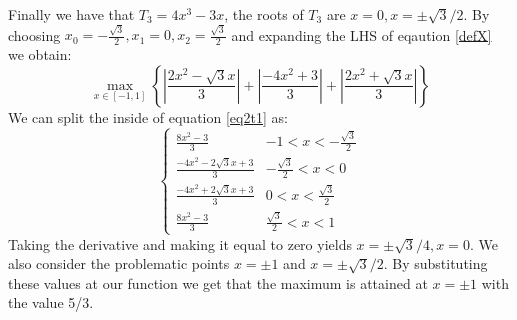 \begin{solution}
Finally we have that $T_3 = 4x^3-3x$, the roots of $T_3$ are $x=0, x=\pm \sqrt{3}/2$. By choosing $x_0 = -\frac{\sqrt{3}}{2}, x_1 = 0, x_2 = \frac{\sqrt{3}}{2}$ and expanding the LHS of eqaution \ref{defX} we obtain:
\begin{equation}
\max_{x \in [-1,1]} \left \{ \left | \frac{2x^2-\sqrt{3}x}{3} \right | + \left | \frac{-4x^2+3}{3} \right | + \left | \frac{2x^2+\sqrt{3}x}{3} \right | \right \}
\label{eq2t1}
\end{equation}
We can split the inside of equation \ref{eq2t1} as:
\[ \begin{cases} 
      \frac{8x^2-3}{3}  &-1< x< -\frac{\sqrt{3}}{2} \\
      \frac{-4x^2-2\sqrt{3}x+3}{3}  &-\frac{\sqrt{3}}{2}< x< 0 \\
      \frac{-4x^2+2\sqrt{3}x+3}{3} & 0 < x < \frac{\sqrt{3}}{2} \\
      \frac{8x^2-3}{3} & \frac{\sqrt{3}}{2}<x<1 
   \end{cases}
\]
Taking the derivative and making it equal to zero yields $x = \pm \sqrt{3}/4, x = 0$. We also consider the problematic points $x = \pm 1$ and $x = \pm \sqrt{3}/2$. By substituting these values at our function we get that the maximum is attained at $x=\pm 1$ with the value 5/3.
\end{solution}

